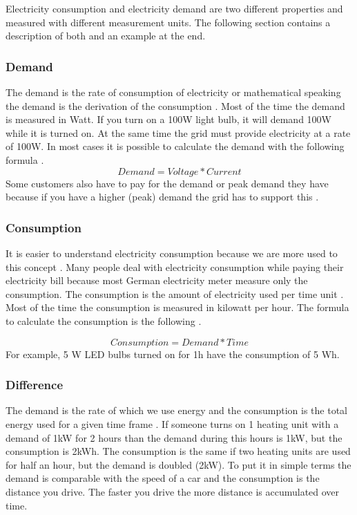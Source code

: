 Electricity consumption and electricity demand are two different properties and measured with different measurement units.
The following section contains a description of both and an example at the end.

\subsubsection{Demand}

The demand is the rate of consumption of electricity or mathematical speaking the demand is the derivation of the consumption \cite{StonyBrookUniversity}.
Most of the time the demand is measured in Watt. If you turn on a 100W light bulb, it will demand 100W while it is turned on. At the same time the grid must provide electricity at a rate of 100W. In most cases it is possible to calculate the demand with the following formula \cite{Eggenberger}.
\begin{equation*}
	Demand = Voltage * Current
\end{equation*}
Some customers also have to pay for the demand or peak demand they have because if you have a higher (peak) demand the grid has to support this \cite{StonyBrookUniversity}\cite{enertiv}.  %


\subsubsection{Consumption}

It is easier to understand electricity consumption because we are more used to this concept \cite{StonyBrookUniversity}. Many people deal with electricity consumption while paying their electricity bill because most German electricity meter measure only the consumption. %
The consumption is the amount of electricity used per time unit \cite{StonyBrookUniversity}\cite{enertiv}. Most of the time the consumption is measured in kilowatt per hour.
The formula to calculate the consumption is the following \cite{StonyBrookUniversity}. %

\begin{equation*}
	Consumption = Demand * Time
\end{equation*}
For example, 5 W LED bulbs turned on for 1h have the consumption of 5 Wh.
\subsubsection{Difference}

The demand is the rate of which we use energy and the consumption is the total energy used for a given time frame \cite{StonyBrookUniversity}. If someone turns on 1 heating unit with a demand of 1kW for 2 hours than the demand during this hours is 1kW, but the consumption is 2kWh. The consumption is the same if two heating units are used for half an hour, but the demand is doubled (2kW). To put it in simple terms the demand is comparable with the speed of a car and the consumption is the distance you drive. The faster you drive the more distance is accumulated over time.